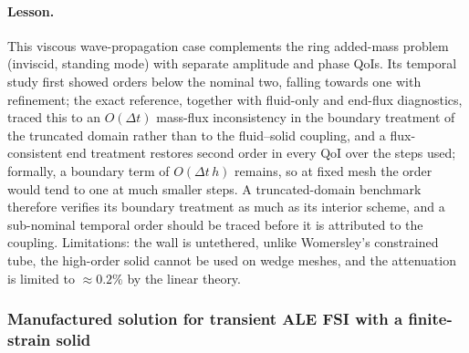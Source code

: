 \paragraph{Lesson.}
This viscous wave-propagation case complements the ring added-mass problem (inviscid, standing mode) with separate amplitude and phase QoIs.
Its temporal study first showed orders below the nominal two, falling towards one with refinement; the exact reference, together with fluid-only and end-flux diagnostics, traced this to an $O(\Delta t)$ mass-flux inconsistency in the boundary treatment of the truncated domain rather than to the fluid--solid coupling, and a flux-consistent end treatment restores second order in every QoI over the steps used; formally, a boundary term of $O(\Delta t\,h)$ remains, so at fixed mesh the order would tend to one at much smaller steps.
A truncated-domain benchmark therefore verifies its boundary treatment as much as its interior scheme, and a sub-nominal temporal order should be traced before it is attributed to the coupling.
Limitations: the wall is untethered, unlike Womersley's constrained tube, the high-order solid cannot be used on wedge meshes, and the attenuation is limited to $\approx0.2\%$ by the linear theory.

\subsubsection{Manufactured solution for transient ALE FSI with a finite-strain solid}\label{sec:mms_fsi}


